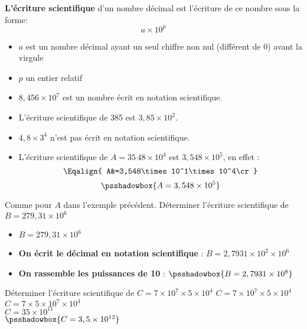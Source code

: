 \begin{definition}
\textbf{L'écriture scientifique} d'un nombre décimal est l'écriture de ce nombre sous la forme:
 $$a\times10^p$$
    \begin{itemize}  
        \item $a$ est un nombre décimal ayant un seul chiffre non nul (différent de 0) avant la virgule
        \item $p$ un entier relatif
    \end{itemize}
\end{definition}

\begin{exemple*1}    
    \begin{itemize}
        \item $8,456\times 10^7$ est un nombre écrit en notation scientifique.
        \item L'écriture scientifique de 385 est $3,85\times10^2$.
        \item $4,8\times 3^4$ n'est pas écrit en notation scientifique.
        \item  L'écriture scientifique de $A=35\,48\times10^4$ est $3,548\times10^5$, en effet :
        $$\Eqalign{
        A&=3,548\times10^1\times10^4\cr
        }$$
        $$\psshadowbox{A=3,548\times10^5}$$
    \end{itemize}

\end{exemple*1}

\begin{methode*1}
    Comme pour $A$ dans l'exemple précédent.
    \exercice
    Déterminer l'écriture scientifique de $B = 279,31\times10^6$
    \correction
    \begin{itemize}
        \item $B = 279,31\times10^6$
        \item \textbf{On écrit le décimal en notation scientifique} : $B = 2,7931\times 10^2 \times10^6$
        \item \textbf{On rassemble les puissances de 10} : $\psshadowbox{B = 2,7931\times 10^8}$
    \end{itemize}
\end{methode*1}

\begin{methode*1}
    \exercice
    Déterminer l'écriture scientifique de $C=7\times 10^7 \times 5 \times 10^4$
    \correction
    $C=7\times 10^7 \times 5 \times 10^4$\\
    $C=7 \times 5 \times 10^7 \times 10^4$\\
    $C=35 \times 10^{11}$\\ 
    $\psshadowbox{C=3,5 \times 10^{12}}$ 
\end{methode*1}

